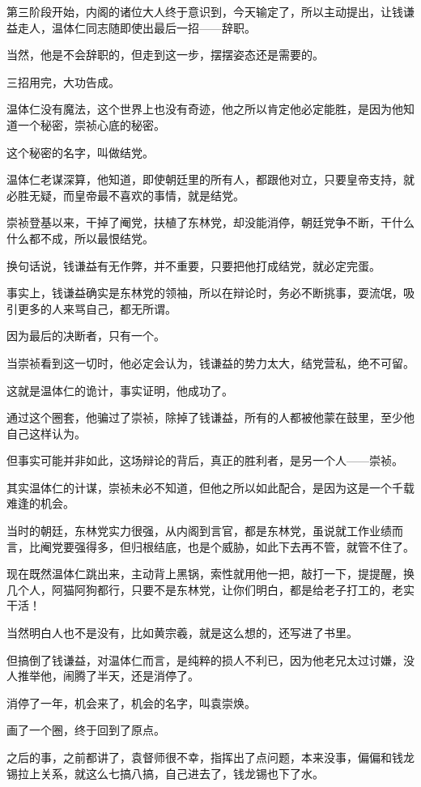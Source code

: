 \begin{multicols}{\theparacolNo}
第三阶段开始，内阁的诸位大人终于意识到，今天输定了，所以主动提出，让钱谦益走人，温体仁同志随即使出最后一招——辞职。

当然，他是不会辞职的，但走到这一步，摆摆姿态还是需要的。

三招用完，大功告成。

温体仁没有魔法，这个世界上也没有奇迹，他之所以肯定他必定能胜，是因为他知道一个秘密，崇祯心底的秘密。

这个秘密的名字，叫做结党。

温体仁老谋深算，他知道，即使朝廷里的所有人，都跟他对立，只要皇帝支持，就必胜无疑，而皇帝最不喜欢的事情，就是结党。

崇祯登基以来，干掉了阉党，扶植了东林党，却没能消停，朝廷党争不断，干什么什么都不成，所以最恨结党。

换句话说，钱谦益有无作弊，并不重要，只要把他打成结党，就必定完蛋。

事实上，钱谦益确实是东林党的领袖，所以在辩论时，务必不断挑事，耍流氓，吸引更多的人来骂自己，都无所谓。

因为最后的决断者，只有一个。

当崇祯看到这一切时，他必定会认为，钱谦益的势力太大，结党营私，绝不可留。

这就是温体仁的诡计，事实证明，他成功了。

通过这个圈套，他骗过了崇祯，除掉了钱谦益，所有的人都被他蒙在鼓里，至少他自己这样认为。

但事实可能并非如此，这场辩论的背后，真正的胜利者，是另一个人——崇祯。

其实温体仁的计谋，崇祯未必不知道，但他之所以如此配合，是因为这是一个千载难逢的机会。

当时的朝廷，东林党实力很强，从内阁到言官，都是东林党，虽说就工作业绩而言，比阉党要强得多，但归根结底，也是个威胁，如此下去再不管，就管不住了。

现在既然温体仁跳出来，主动背上黑锅，索性就用他一把，敲打一下，提提醒，换几个人，阿猫阿狗都行，只要不是东林党，让你们明白，都是给老子打工的，老实干活！

当然明白人也不是没有，比如黄宗羲，就是这么想的，还写进了书里。

但搞倒了钱谦益，对温体仁而言，是纯粹的损人不利已，因为他老兄太过讨嫌，没人推举他，闹腾了半天，还是消停了。

消停了一年，机会来了，机会的名字，叫袁崇焕。

画了一个圈，终于回到了原点。

之后的事，之前都讲了，袁督师很不幸，指挥出了点问题，本来没事，偏偏和钱龙锡拉上关系，就这么七搞八搞，自己进去了，钱龙锡也下了水。


\end{multicols}
